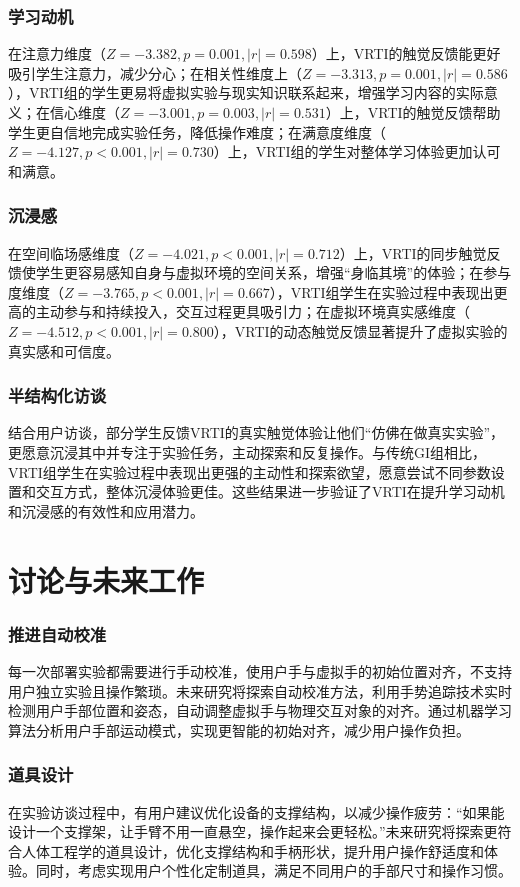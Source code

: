 \documentclass[runningheads]{llncs}
\begin{document}
\subsubsection{学习动机}
在注意力维度（$Z=-3.382,p=0.001,|r|=0.598$）上，VRTI的触觉反馈能更好吸引学生注意力，减少分心；在相关性维度上（$Z=-3.313,p=0.001,|r|=0.586$），VRTI组的学生更易将虚拟实验与现实知识联系起来，增强学习内容的实际意义；在信心维度（$Z=-3.001,p=0.003,|r|=0.531$）上，VRTI的触觉反馈帮助学生更自信地完成实验任务，降低操作难度；在满意度维度（$Z=-4.127,p<0.001,|r|=0.730$）上，VRTI组的学生对整体学习体验更加认可和满意。

\subsubsection{沉浸感}
在空间临场感维度（$Z=-4.021,p<0.001,|r|=0.712$）上，VRTI的同步触觉反馈使学生更容易感知自身与虚拟环境的空间关系，增强“身临其境”的体验；在参与度维度（$Z=-3.765,p<0.001,|r|=0.667$），VRTI组学生在实验过程中表现出更高的主动参与和持续投入，交互过程更具吸引力；在虚拟环境真实感维度（$Z=-4.512,p<0.001,|r|=0.800$），VRTI的动态触觉反馈显著提升了虚拟实验的真实感和可信度。

\subsubsection{半结构化访谈}
结合用户访谈，部分学生反馈VRTI的真实触觉体验让他们“仿佛在做真实实验”，更愿意沉浸其中并专注于实验任务，主动探索和反复操作。与传统GI组相比，VRTI组学生在实验过程中表现出更强的主动性和探索欲望，愿意尝试不同参数设置和交互方式，整体沉浸体验更佳。这些结果进一步验证了VRTI在提升学习动机和沉浸感的有效性和应用潜力。

\section{讨论与未来工作}
\subsubsection{推进自动校准}
每一次部署实验都需要进行手动校准，使用户手与虚拟手的初始位置对齐，不支持用户独立实验且操作繁琐。未来研究将探索自动校准方法，利用手势追踪技术实时检测用户手部位置和姿态，自动调整虚拟手与物理交互对象的对齐。通过机器学习算法分析用户手部运动模式，实现更智能的初始对齐，减少用户操作负担。

\subsubsection{道具设计}
在实验访谈过程中，有用户建议优化设备的支撑结构，以减少操作疲劳：“如果能设计一个支撑架，让手臂不用一直悬空，操作起来会更轻松。”未来研究将探索更符合人体工程学的道具设计，优化支撑结构和手柄形状，提升用户操作舒适度和体验。同时，考虑实现用户个性化定制道具，满足不同用户的手部尺寸和操作习惯。
\end{document}
